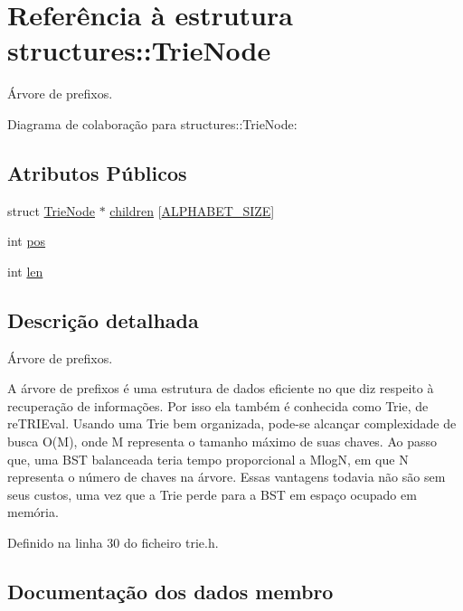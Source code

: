 \hypertarget{structstructures_1_1_trie_node}{}\section{Referência à estrutura structures\+:\+:Trie\+Node}
\label{structstructures_1_1_trie_node}


Árvore de prefixos.  




Diagrama de colaboração para structures\+:\+:Trie\+Node\+:
\subsection*{Atributos Públicos}
\begin{DoxyCompactItemize}
\item 
struct \hyperlink{structstructures_1_1_trie_node}{Trie\+Node} $\ast$ \hyperlink{structstructures_1_1_trie_node_ab34ab18a2b5a71b8e2081566d3ed56d6}{children} \mbox{[}\hyperlink{trie_8h_a6572f1706059832f94025fa12c6c45ed}{A\+L\+P\+H\+A\+B\+E\+T\+\_\+\+S\+I\+ZE}\mbox{]}
\item 
int \hyperlink{structstructures_1_1_trie_node_a56bdf19e4eadeafdb4480b55c5758ced}{pos}
\item 
int \hyperlink{structstructures_1_1_trie_node_a4cc910f321fc31a5d51b65ad0fe338c9}{len}
\end{DoxyCompactItemize}


\subsection{Descrição detalhada}
Árvore de prefixos. 

A árvore de prefixos é uma estrutura de dados eficiente no que diz respeito à recuperação de informações. Por isso ela também é conhecida como Trie, de re\+T\+R\+I\+Eval. Usando uma Trie bem organizada, pode-\/se alcançar complexidade de busca O(\+M), onde M representa o tamanho máximo de suas chaves. Ao passo que, uma B\+ST balanceada teria tempo proporcional a MlogN, em que N representa o número de chaves na árvore. Essas vantagens todavia não são sem seus custos, uma vez que a Trie perde para a B\+ST em espaço ocupado em memória. 

Definido na linha 30 do ficheiro trie.\+h.



\subsection{Documentação dos dados membro}
\mbox{\label{structstructures_1_1_trie_node_ab34ab18a2b5a71b8e2081566d3ed56d6}} 

